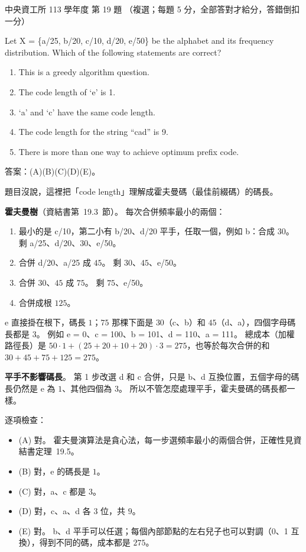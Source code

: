 \begin{pastexam}[label={px:ncu-113-dsa-19}]{中央資工所 113 學年度 第 19 題}
（複選；每題 5 分，全部答對才給分，答錯倒扣一分）

Let X = \{a/25, b/20, c/10, d/20, e/50\} be the alphabet and its frequency distribution. Which of the following
statements are correct?
\begin{enumerate}[label=(\Alph*)]
\item This is a greedy algorithm question.
\item The code length of `e' is 1.
\item `a' and `c' have the same code length.
\item The code length for the string ``cad'' is 9.
\item There is more than one way to achieve optimum prefix code.
\end{enumerate}
\end{pastexam}

\begin{pastsoln}
答案：(A)(B)(C)(D)(E)。

題目沒說，這裡把「code length」理解成霍夫曼碼（最佳前綴碼）的碼長。

\textbf{霍夫曼樹}（資結書第~19.3~節）。 每次合併頻率最小的兩個：
\begin{enumerate}
\item 最小的是 c/10，第二小有 b/20、d/20 平手，任取一個，例如 b：合成 $30$。 剩 a/25、d/20、$30$、e/50。
\item 合併 d/20、a/25 成 $45$。 剩 $30$、$45$、e/50。
\item 合併 $30$、$45$ 成 $75$。 剩 $75$、e/50。
\item 合併成根 $125$。
\end{enumerate}
e 直接掛在根下，碼長 $1$；$75$ 那棵下面是 $30$（c、b）和 $45$（d、a），四個字母碼長都是 $3$。 例如
e = 0、c = 100、b = 101、d = 110、a = 111。 總成本（加權路徑長）是
$50 \cdot 1 + (25 + 20 + 10 + 20) \cdot 3 = 275$，也等於每次合併的和 $30 + 45 + 75 + 125 = 275$。

\textbf{平手不影響碼長}。 第 1 步改選 d 和 c 合併，只是 b、d 互換位置，五個字母的碼長仍然是
e 為 $1$、其他四個為 $3$。 所以不管怎麼處理平手，霍夫曼碼的碼長都一樣。

逐項檢查：
\begin{itemize}
\item (A) 對。 霍夫曼演算法是貪心法，每一步選頻率最小的兩個合併，正確性見資結書定理~19.5。
\item (B) 對，e 的碼長是 $1$。
\item (C) 對，a、c 都是 $3$。
\item (D) 對，c、a、d 各 $3$ 位，共 $9$。
\item (E) 對。 b、d 平手可以任選；每個內部節點的左右兒子也可以對調（0、1 互換），得到不同的碼，成本都是
$275$。
\end{itemize}
\end{pastsoln}
